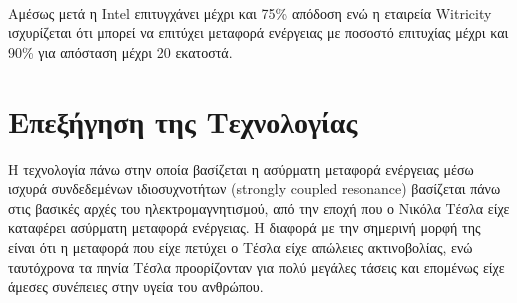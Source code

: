 Αμέσως μετά η Intel\textsuperscript{\textregistered} επιτυγχάνει μέχρι και 75\% απόδοση \cite{intel_recharg} ενώ η εταιρεία Witricity\textsuperscript{\textregistered}
ισχυρίζεται ότι μπορεί να επιτύχει μεταφορά ενέργειας με ποσοστό επιτυχίας μέχρι και 90\% \cite{witricity_90} για απόσταση μέχρι 20 εκατοστά.


\section{Επεξήγηση της Τεχνολογίας}
Η τεχνολογία πάνω στην οποία βασίζεται η ασύρματη μεταφορά ενέργειας μέσω ισχυρά συνδεδεμένων ιδιοσυχνοτήτων (strongly coupled resonance) βασίζεται πάνω στις βασικές
αρχές του ηλεκτρομαγνητισμού, από την εποχή που ο Νικόλα Τέσλα είχε καταφέρει ασύρματη μεταφορά ενέργειας. Η διαφορά με την σημερινή μορφή της είναι ότι
η μεταφορά που είχε πετύχει ο Τέσλα είχε απώλειες ακτινοβολίας, ενώ ταυτόχρονα τα πηνία Tέσλα προορίζονταν για πολύ μεγάλες τάσεις και επομένως είχε άμεσες συνέπειες
στην υγεία του ανθρώπου.

